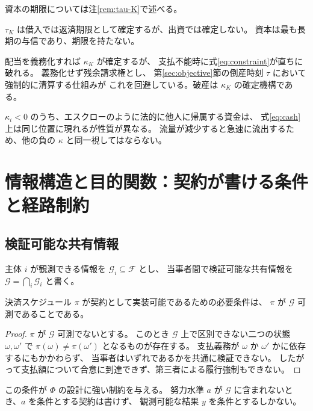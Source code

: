 資本の期限については注\ref{rem:tau-K}で述べる。

\begin{remark}
\label{rem:tau-K}
$\tau_K$ は借入では返済期限として確定するが、出資では確定しない。
資本は最も長期の与信であり、期限を持たない。

配当を義務化すれば $\kappa_K$ が確定するが、
支払不能時に式\eqref{eq:constraint}が直ちに破れる。
義務化せず残余請求権とし、
第\ref{sec:objective}節の倒産時刻 $\tau$ において強制的に清算する仕組みが
これを回避している。破産は $\kappa_K$ の確定機構である。
\end{remark}

\begin{remark}[預り金の扱い]
$\kappa_i<0$ のうち、エスクローのように法的に他人に帰属する資金は、
式\eqref{eq:cash}上は同じ位置に現れるが性質が異なる。
流量が減少すると急速に流出するため、他の負の $\kappa$ と同一視してはならない。
\end{remark}

\chapter{情報構造と目的関数：契約が書ける条件と経路制約}
\label{sec:info}

\section{検証可能な共有情報}
\label{sec:verifiable}

主体 $i$ が観測できる情報を $\mathcal{G}_i\subseteq\mathcal{F}$ とし、
当事者間で検証可能な共有情報を $\mathcal{G}=\bigcap_i \mathcal{G}_i$ と書く。

\begin{proposition}[実装可能性]
\label{prop:implementable}
決済スケジュール $\pi$ が契約として実装可能であるための必要条件は、
$\pi$ が $\mathcal{G}$ 可測であることである。
\end{proposition}

\begin{proof}
$\pi$ が $\mathcal{G}$ 可測でないとする。
このとき $\mathcal{G}$ 上で区別できない二つの状態 $\omega,\omega'$ で
$\pi(\omega)\neq\pi(\omega')$ となるものが存在する。
支払義務が $\omega$ か $\omega'$ かに依存するにもかかわらず、
当事者はいずれであるかを共通に検証できない。
したがって支払額について合意に到達できず、第三者による履行強制もできない。
\end{proof}

この条件が $\Phi$ の設計に強い制約を与える。
努力水準 $a$ が $\mathcal{G}$ に含まれないとき、$a$ を条件とする契約は書けず、
観測可能な結果 $y$ を条件とするしかない。

